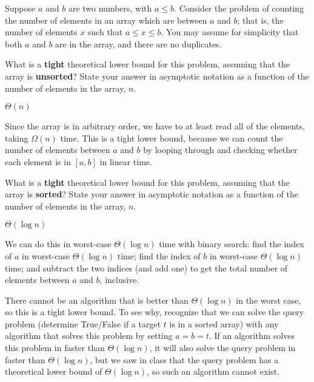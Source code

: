 \begin{prob}[(2 points)]
    Suppose $a$ and $b$ are two numbers, with $a \leq b$.
    Consider the problem of counting the number of elements in an array which
    are between $a$ and $b$; that is, the number of elements $x$ such that $a
    \leq x \leq b$. You may assume for simplicity that both $a$ and $b$ are in the array,
    and there are no duplicates.

    \begin{subprobset}
        \begin{subprob}
            What is a \textbf{tight} theoretical lower bound for this problem, assuming that
            the array is \textbf{unsorted}? State your answer in asymptotic notation as a function
            of the number of elements in the array, $n$.

            \begin{soln}
                $\Theta(n)$

                Since the array is in arbitrary order, we have to at least read all
                of the elements, taking $\Omega(n)$ time. This is a tight lower bound,
                because we can count the number of elements between $a$ and $b$ by
                looping through and checking whether each element is in $[a, b]$
                in linear time.
            \end{soln}
        \end{subprob}

        \begin{subprob}
            What is a \textbf{tight} theoretical lower bound for this problem, assuming that
            the array is \textbf{sorted}? State your answer in asymptotic notation as a function
            of the number of elements in the array, $n$.

            \begin{soln}
                $\Theta(\log n)$

                We can do this in worst-case $\Theta(\log n)$ time with binary search:
                find the index of $a$ in worst-case $\Theta(\log n)$ time;
                find the index of $b$ in worst-case $\Theta(\log n)$ time;
                and subtract the two indices (and add one) to get the total number
                of elements between $a$ and $b$, inclusive.

                There cannot be an algorithm that is better than $\Theta(\log n)$
                in the worst case, so this is a tight lower bound. To see why, recognize
                that we can solve the query problem (determine True/False if a target $t$
                is in a sorted array) with any algorithm that solves this problem by
                setting $a = b = t$. If an algorithm solves this problem in faster than
                $\Theta(\log n)$, it will also solve the query problem in faster than
                $\Theta(\log n)$, but we saw in class that the query problem has a theoretical
                lower bound of $\Theta(\log n)$, so such an algorithm cannot exist.
            \end{soln}


\end{subprob}
\end{subprobset}
\end{prob}
